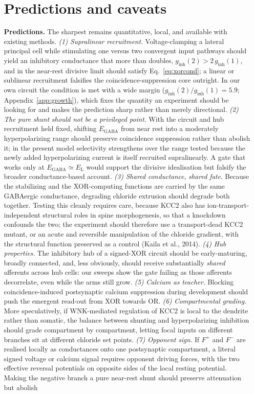 \documentclass[11pt,a4paper]{article}
\begin{document}
\section{Predictions and caveats}\label{sec:pred}
\textbf{Predictions.} The sharpest remains quantitative, local, and available with existing methods. \emph{(1) Supralinear recruitment.} Voltage-clamping a lateral principal cell while stimulating one versus two convergent input pathways should yield an inhibitory conductance that more than doubles, $g_{\mathrm{inh}}(2)>2\,g_{\mathrm{inh}}(1)$, and in the near-rest divisive limit should satisfy Eq.~\eqref{eq:xorcond}; a linear or sublinear recruitment falsifies the coincidence-suppression core outright. In our own circuit the condition is met with a wide margin ($g_{\mathrm{inh}}(2)/g_{\mathrm{inh}}(1)=5.9$; Appendix~\ref{app:growth}), which fixes the quantity an experiment should be looking for and makes the prediction sharp rather than merely directional. \emph{(2) The pure shunt should not be a privileged point.} With the circuit and hub recruitment held fixed, shifting $E_{\mathrm{GABA}}$ from near rest into a moderately hyperpolarizing range should preserve coincidence suppression rather than abolish it; in the present model selectivity strengthens over the range tested because the newly added hyperpolarizing current is itself recruited supralinearly. A gate that works only at $E_{\mathrm{GABA}}\simeq E_{\mathrm{L}}$ would support the divisive idealisation but falsify the broader conductance-based account. \emph{(3) Shared conductance, shared fate.} Because the stabilizing and the XOR-computing functions are carried by the same GABAergic conductance, degrading chloride extrusion should degrade both together. Testing this cleanly requires care, because KCC2 also has ion-transport-independent structural roles in spine morphogenesis, so that a knockdown confounds the two; the experiment should therefore use a transport-dead KCC2 mutant, or an acute and reversible manipulation of the chloride gradient, with the structural function preserved as a control (Kaila et al., 2014). \emph{(4) Hub properties.} The inhibitory hub of a signed-XOR circuit should be early-maturing, broadly connected, and, less obviously, should receive substantially \emph{shared} afferents across hub cells: our sweeps show the gate failing as those afferents decorrelate, even while the arms still grow. \emph{(5) Calcium as teacher.} Blocking coincidence-induced postsynaptic calcium suppression during development should push the emergent read-out from XOR towards OR. \emph{(6) Compartmental grading.} More speculatively, if WNK-mediated regulation of KCC2 is local to the dendrite rather than somatic, the balance between shunting and hyperpolarizing inhibition should grade compartment by compartment, letting focal inputs on different branches sit at different chloride set points. \emph{(7) Opponent sign.} If $F^{+}$ and $F^{-}$ are realised locally as conductances onto one postsynaptic compartment, a literal signed voltage or calcium signal requires opponent driving forces, with the two effective reversal potentials on opposite sides of the local resting potential. Making the negative branch a pure near-rest shunt should preserve attenuation but abolish 
\end{document}
